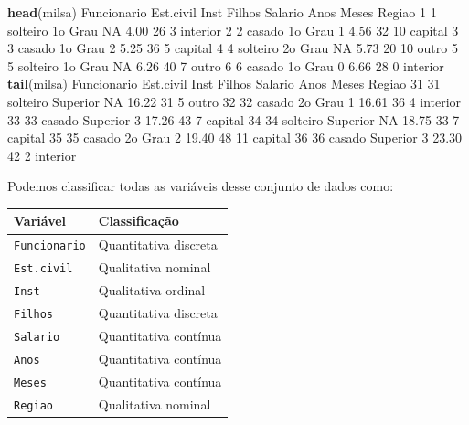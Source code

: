 \documentclass[10pt,a4paper]{book}
\newenvironment{Shaded}{\begin{snugshade}}{\end{snugshade}}
\newcommand{\KeywordTok}[1]{\textcolor[rgb]{0.13,0.29,0.53}{\textbf{#1}}}
\newcommand{\DecValTok}[1]{\textcolor[rgb]{0.00,0.00,0.81}{#1}}
\newcommand{\FloatTok}[1]{\textcolor[rgb]{0.00,0.00,0.81}{#1}}
\newcommand{\OtherTok}[1]{\textcolor[rgb]{0.56,0.35,0.01}{#1}}
\newcommand{\NormalTok}[1]{#1}
\begin{document}
\begin{Shaded}
\begin{Highlighting}[]
\KeywordTok{head}\NormalTok{(milsa)}
\NormalTok{  Funcionario Est.civil    Inst Filhos Salario Anos Meses   Regiao}
\DecValTok{1}           \DecValTok{1}\NormalTok{  solteiro 1o Grau     }\OtherTok{NA}    \FloatTok{4.00}   \DecValTok{26}     \DecValTok{3}\NormalTok{ interior}
\DecValTok{2}           \DecValTok{2}\NormalTok{    casado 1o Grau      }\DecValTok{1}    \FloatTok{4.56}   \DecValTok{32}    \DecValTok{10}\NormalTok{  capital}
\DecValTok{3}           \DecValTok{3}\NormalTok{    casado 1o Grau      }\DecValTok{2}    \FloatTok{5.25}   \DecValTok{36}     \DecValTok{5}\NormalTok{  capital}
\DecValTok{4}           \DecValTok{4}\NormalTok{  solteiro 2o Grau     }\OtherTok{NA}    \FloatTok{5.73}   \DecValTok{20}    \DecValTok{10}\NormalTok{    outro}
\DecValTok{5}           \DecValTok{5}\NormalTok{  solteiro 1o Grau     }\OtherTok{NA}    \FloatTok{6.26}   \DecValTok{40}     \DecValTok{7}\NormalTok{    outro}
\DecValTok{6}           \DecValTok{6}\NormalTok{    casado 1o Grau      }\DecValTok{0}    \FloatTok{6.66}   \DecValTok{28}     \DecValTok{0}\NormalTok{ interior}
\KeywordTok{tail}\NormalTok{(milsa)}
\NormalTok{   Funcionario Est.civil     Inst Filhos Salario Anos Meses   Regiao}
\DecValTok{31}          \DecValTok{31}\NormalTok{  solteiro Superior     }\OtherTok{NA}   \FloatTok{16.22}   \DecValTok{31}     \DecValTok{5}\NormalTok{    outro}
\DecValTok{32}          \DecValTok{32}\NormalTok{    casado  2o Grau      }\DecValTok{1}   \FloatTok{16.61}   \DecValTok{36}     \DecValTok{4}\NormalTok{ interior}
\DecValTok{33}          \DecValTok{33}\NormalTok{    casado Superior      }\DecValTok{3}   \FloatTok{17.26}   \DecValTok{43}     \DecValTok{7}\NormalTok{  capital}
\DecValTok{34}          \DecValTok{34}\NormalTok{  solteiro Superior     }\OtherTok{NA}   \FloatTok{18.75}   \DecValTok{33}     \DecValTok{7}\NormalTok{  capital}
\DecValTok{35}          \DecValTok{35}\NormalTok{    casado  2o Grau      }\DecValTok{2}   \FloatTok{19.40}   \DecValTok{48}    \DecValTok{11}\NormalTok{  capital}
\DecValTok{36}          \DecValTok{36}\NormalTok{    casado Superior      }\DecValTok{3}   \FloatTok{23.30}   \DecValTok{42}     \DecValTok{2}\NormalTok{ interior}
\end{Highlighting}
\end{Shaded}

Podemos classificar todas as variáveis desse conjunto de dados como:

\begin{longtable}[]{@{}ll@{}}
\toprule
Variável & Classificação\tabularnewline
\midrule
\endhead
\texttt{Funcionario} & Quantitativa discreta\tabularnewline
\texttt{Est.civil} & Qualitativa nominal\tabularnewline
\texttt{Inst} & Qualitativa ordinal\tabularnewline
\texttt{Filhos} & Quantitativa discreta\tabularnewline
\texttt{Salario} & Quantitativa contínua\tabularnewline
\texttt{Anos} & Quantitativa contínua\tabularnewline
\texttt{Meses} & Quantitativa contínua\tabularnewline
\texttt{Regiao} & Qualitativa nominal\tabularnewline
\bottomrule
\end{longtable}
\end{document}
